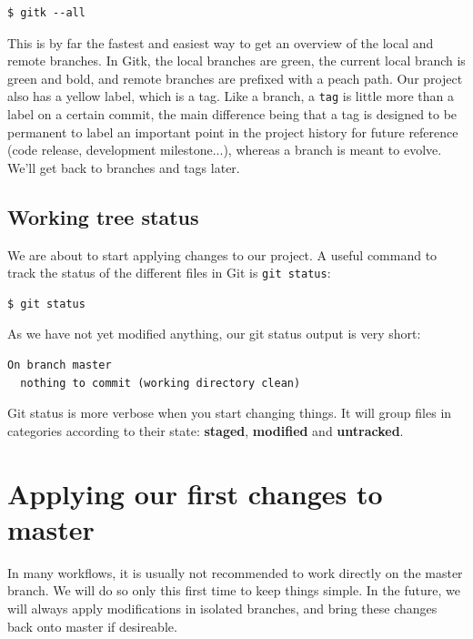 \documentclass{../../common/tufte-latex/tufte-handout}
\begin{document}
\begin{lstlisting}[style=BashInputStyle]
  $ gitk --all
\end{lstlisting}

This is by far the fastest and easiest way to get an overview of the local and remote branches.
In Gitk, the local branches are green, the current local branch is green and bold, and remote branches are prefixed with a peach path.
Our project also has a yellow label, which is a tag.
Like a branch, a \texttt{tag} is little more than a label on a certain commit, the main difference being that a tag is designed to be permanent to label an important point in the project history for future reference (code release, development milestone...), whereas a branch is meant to evolve.
We'll get back to branches and tags later.

\subsection{Working tree status}

We are about to start applying changes to our project.
A useful command to track the status of the different files in Git is \texttt{git status}:

\begin{lstlisting}[style=BashInputStyle]
  $ git status
\end{lstlisting}

As we have not yet modified anything, our git status output is very short:

\begin{lstlisting}[style=BashInputStyle]
  On branch master
  nothing to commit (working directory clean)
\end{lstlisting}

Git status is more verbose when you start changing things.
It will group files in categories according to their state: \textbf{staged}, \textbf{modified} and \textbf{untracked}.

\section{Applying our first changes to master}
In many workflows, it is usually not recommended to work directly on the master branch.
We will do so only this first time to keep things simple.
In the future, we will always apply modifications in isolated branches, and bring these changes back onto master if desireable.
\end{document}
